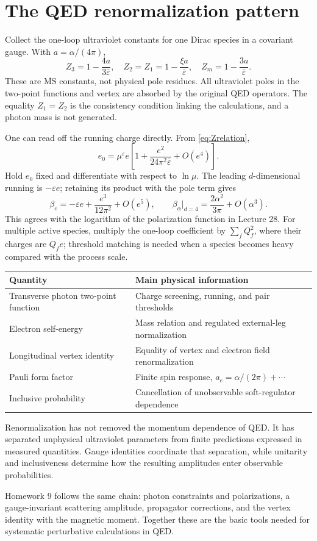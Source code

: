 \documentclass[11pt]{article}
\newcommand{\eps}{\varepsilon}
\newcommand{\MSbar}{\overline{\mathrm{MS}}}
\newcommand{\module}[1]{\clearpage\section{#1}}
\begin{document}
\module{The QED renormalization pattern}
Collect the one-loop ultraviolet constants for one Dirac species in a
covariant gauge. With \(a=\alpha/(4\pi)\),
\begin{equation}
 Z_3=1-\frac{4a}{3\bar\eps},\quad
 Z_2=Z_1=1-\frac{\xi a}{\bar\eps},\quad
 Z_m=1-\frac{3a}{\bar\eps}.
\end{equation}
These are \(\MSbar\) constants, not physical pole residues. All ultraviolet
poles in the two-point functions and vertex are absorbed by the original
QED operators. The equality \(Z_1=Z_2\) is the consistency condition
linking the calculations, and a photon mass is not generated.

One can read off the running charge directly. From \eqref{eq:Zrelation},
\begin{equation}
 e_0=\mu^\eps e\left[1+\frac{e^2}{24\pi^2\bar\eps}+O(e^4)\right].
\end{equation}
Hold \(e_0\) fixed and differentiate with respect to \(\ln\mu\).
The leading \(d\)-dimensional running is \(-\eps e\); retaining its
product with the pole term gives
\begin{equation}
 \beta_e=-\eps e+\frac{e^3}{12\pi^2}+O(e^5),\qquad
 \beta_\alpha\big|_{d=4}=\frac{2\alpha^2}{3\pi}+O(\alpha^3).
\end{equation}
This agrees with the logarithm of the polarization function in Lecture
28. For multiple active species, multiply the one-loop coefficient by
\(\sum_f Q_f^2\), where their charges are \(Q_f e\); threshold matching
is needed when a species becomes heavy compared with the process scale.

\begin{center}
\begin{tabular}{p{}p{}}
\toprule
Quantity & Main physical information \\
\midrule
Transverse photon two-point function & Charge screening, running, and pair thresholds \\
Electron self-energy & Mass relation and regulated external-leg normalization \\
Longitudinal vertex identity & Equality of vertex and electron field renormalization \\
Pauli form factor & Finite spin response, \(a_e=\alpha/(2\pi)+\cdots\) \\
Inclusive probability & Cancellation of unobservable soft-regulator dependence \\
\bottomrule
\end{tabular}
\end{center}
Renormalization has not removed the momentum dependence of QED. It has
separated unphysical ultraviolet parameters from finite predictions
expressed in measured quantities. Gauge identities coordinate that
separation, while unitarity and inclusiveness determine how the resulting
amplitudes enter observable probabilities.

Homework 9 follows the same chain: photon constraints and polarizations,
a gauge-invariant scattering amplitude, propagator corrections, and the
vertex identity with the magnetic moment. Together these are the basic
tools needed for systematic perturbative calculations in QED.
\end{document}
